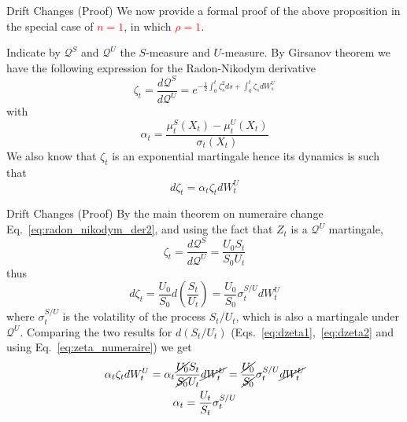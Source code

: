 \documentclass{beamer}
\begin{document}
\begin{frame}{Drift Changes (Proof)}
	We now provide a formal proof of the above proposition in the special case of \textcolor{red}{$n=1$}, in which \textcolor{red}{$\rho=1$}.
	
	Indicate by $\mathcal{Q}^S$ and $\mathcal{Q}^U$ the $S$-measure and $U$-measure. By Girsanov theorem we have the following expression for the Radon-Nikodym derivative
	\begin{equation*}
	\zeta_t = \frac{d\mathcal{Q}^S}{d\mathcal{Q}^U} = e^{-\frac{1}{2}\int_0^t\zeta_s^2 ds + \int_0^t\zeta_s dW_s^U}
	\end{equation*}
	with 
	\begin{equation*}
	\alpha_t=\frac{\mu^S_t(X_t)-\mu_t^U(X_t)}{\sigma_t(X_t)}
	\end{equation*}
	We also know that $\zeta_t$ is an exponential martingale hence its dynamics is such that 
	\begin{equation}
	d\zeta_t=\alpha_t\zeta_tdW_t^U
	\label{eq:dzeta1}
	\end{equation}
\end{frame}

\begin{frame}{Drift Changes (Proof)}
	By the main theorem on numeraire change Eq.~\ref{eq:radon_nikodym_der2}, and using the fact that $Z_t$ is a $\mathcal{Q}^U$ martingale, 
	\begin{equation}
	\zeta_t = \frac{d\mathcal{Q}^S}{d\mathcal{Q}^U} = \frac{U_0S_t}{S_0U_t}
	\label{eq:zeta_numeraire}
	\end{equation}
	thus
	\begin{equation}
	d\zeta_t= \frac{U_0}{S_0}d\left(\frac{S_t}{U_t}\right)= \frac{U_0}{S_0}\sigma_t^{S/U}dW_t^U
	\label{eq:dzeta2}
	\end{equation}
	where $\sigma^{S/U}_t$ is the volatility of the process $S_t/U_t$, which is also a martingale under $\mathcal{Q}^U$. Comparing the two results for $d(S_t/U_t)$ (Eqs.~\ref{eq:dzeta1},~\ref{eq:dzeta2} and using Eq.~\ref{eq:zeta_numeraire}) we get
	\begin{equation}
		\begin{gathered}
		\alpha_t\zeta_tdW_t^U = \alpha_t\frac{\cancel{U_0}S_t}{\cancel{S_0}U_t}\cancel{dW_t^U}=	\frac{\cancel{U_0}}{\cancel{S_0}}\sigma^{S/U}_t\cancel{dW_t^U} \\
		\alpha_t = \frac{U_t}{S_t}\sigma^{S/U}_t
		\end{gathered}
	\end{equation}
\end{frame}
\end{document}
